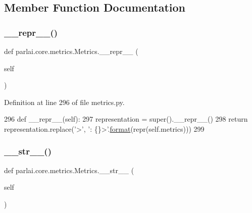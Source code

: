 \subsection{Member Function Documentation}
\mbox{\label{classparlai_1_1core_1_1metrics_1_1Metrics_a652e6f48f5754c1365f18a7f2c86353b}} 
\subsubsection{\texorpdfstring{\+\_\+\+\_\+repr\+\_\+\+\_\+()}{\_\_repr\_\_()}}
{\footnotesize\ttfamily def parlai.\+core.\+metrics.\+Metrics.\+\_\+\+\_\+repr\+\_\+\+\_\+ (\begin{DoxyParamCaption}\item[{}]{self }\end{DoxyParamCaption})}



Definition at line 296 of file metrics.\+py.


\begin{DoxyCode}
296     \textcolor{keyword}{def }\_\_repr\_\_(self):
297         representation = super().\_\_repr\_\_()
298         \textcolor{keywordflow}{return} representation.replace(\textcolor{stringliteral}{'>'}, \textcolor{stringliteral}{': \{\}>'}.\hyperlink{namespaceparlai_1_1chat__service_1_1services_1_1messenger_1_1shared__utils_a32e2e2022b824fbaf80c747160b52a76}{format}(repr(self.metrics)))
299 
\end{DoxyCode}
\mbox{\label{classparlai_1_1core_1_1metrics_1_1Metrics_a3d15255e3daf76e9aeabd23c94f879cf}} 
\subsubsection{\texorpdfstring{\+\_\+\+\_\+str\+\_\+\+\_\+()}{\_\_str\_\_()}}
{\footnotesize\ttfamily def parlai.\+core.\+metrics.\+Metrics.\+\_\+\+\_\+str\+\_\+\+\_\+ (\begin{DoxyParamCaption}\item[{}]{self }\end{DoxyParamCaption})}



